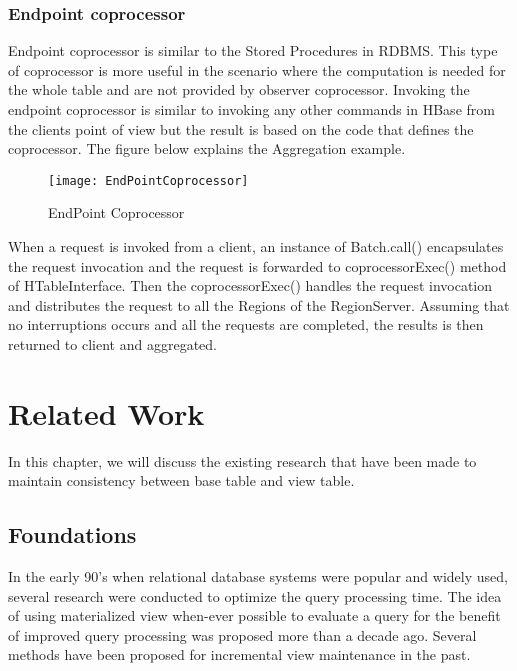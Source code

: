 \documentclass[11pt,a4paper,bibtotoc,idxtotoc,headsepline,footsepline,footexclude,BCOR12mm,DIV13]{scrbook}
\begin{document}
\newpage
\subsection{Endpoint coprocessor}

Endpoint coprocessor is similar to the Stored Procedures in RDBMS. This type of coprocessor is more useful in the scenario where the computation is needed for the whole table and are not provided by observer coprocessor\cite{hbase:coprocessors}. Invoking the endpoint coprocessor is similar to invoking any other commands in HBase from the client\textquotesingle s point of view but the result is based on the code that defines the coprocessor\cite{coprocessor:detail}. The figure below explains the Aggregation example\cite{coprocessor:detail}.

\begin{figure}
    \centering
    \texttt{[image: EndPointCoprocessor]}
    \caption{EndPoint Coprocessor}
    
\end{figure}

When a request is invoked from a client, an instance of Batch.call() encapsulates the request invocation and the request is forwarded to coprocessorExec() method of HTableInterface. Then the coprocessorExec() handles the request invocation and distributes the request to all the Regions of the RegionServer. Assuming that no interruptions occurs and all the requests are completed, the results is then returned to client and aggregated\cite{coprocessor:detail}.

\newpage
\chapter{Related Work}
In this chapter, we will discuss the existing research that have been made to maintain consistency between base table and view table.

\section{Foundations}
\label{Foundations}
In the early 90's when relational database systems were popular and widely used, several research were conducted to optimize the query processing time. The idea of using materialized view when-ever possible to evaluate a query for the benefit of improved query processing was proposed more than a decade ago\cite{maintenance:optimizingqueries}. Several methods have been proposed for incremental view maintenance in the past\cite{blakeley:efficiently, gupta:maintaining, agrawal:efficient}.
\end{document}
